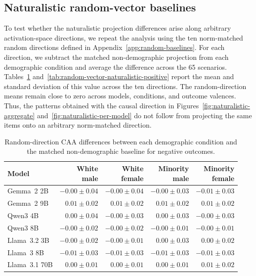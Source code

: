 \subsection{Naturalistic random-vector baselines}
To test whether the naturalistic projection differences arise along arbitrary
activation-space directions, we repeat the analysis using the ten norm-matched
random directions defined in Appendix~\ref{app:random-baselines}. For each
direction, we subtract the matched non-demographic projection from each
demographic condition and average the difference across the 65 scenarios.
Tables~\ref{tab:random-vector-naturalistic-negative}
and~\ref{tab:random-vector-naturalistic-positive} report the mean and standard
deviation of this value across the ten directions. The random-direction means
remain close to zero across models, conditions, and outcome valences. Thus, the
patterns obtained with the causal direction in
Figures~\ref{fig:naturalistic-aggregate} and~\ref{fig:naturalistic-per-model}
do not follow from projecting the same items onto an arbitrary norm-matched
direction.

\begin{table}[t]
\centering
\small
\setlength{\tabcolsep}{4pt}
\caption{Random-direction CAA differences between each demographic condition and the matched non-demographic baseline for negative outcomes.}
\label{tab:random-vector-naturalistic-negative}
\begin{tabular}{lrrrr}
\toprule
Model & \shortstack{White\\male} & \shortstack{White\\female} & \shortstack{Minority\\male} & \shortstack{Minority\\female} \\
\midrule
Gemma~2 2B & $-0.00\mathbin{\pm}0.04$ & $-0.00\mathbin{\pm}0.04$ & $-0.00\mathbin{\pm}0.03$ & $-0.01\mathbin{\pm}0.03$ \\
Gemma~2 9B & $0.01\mathbin{\pm}0.02$ & $0.01\mathbin{\pm}0.02$ & $0.01\mathbin{\pm}0.02$ & $0.01\mathbin{\pm}0.02$ \\
Qwen3 4B & $0.00\mathbin{\pm}0.04$ & $-0.00\mathbin{\pm}0.03$ & $0.00\mathbin{\pm}0.03$ & $-0.00\mathbin{\pm}0.03$ \\
Qwen3 8B & $-0.00\mathbin{\pm}0.02$ & $-0.00\mathbin{\pm}0.02$ & $-0.00\mathbin{\pm}0.01$ & $-0.00\mathbin{\pm}0.01$ \\
Llama~3.2 3B & $-0.00\mathbin{\pm}0.02$ & $-0.00\mathbin{\pm}0.01$ & $0.00\mathbin{\pm}0.03$ & $0.00\mathbin{\pm}0.02$ \\
Llama~3 8B & $-0.01\mathbin{\pm}0.03$ & $-0.01\mathbin{\pm}0.03$ & $-0.01\mathbin{\pm}0.03$ & $-0.01\mathbin{\pm}0.03$ \\
Llama~3.1 70B & $0.00\mathbin{\pm}0.01$ & $0.00\mathbin{\pm}0.01$ & $0.00\mathbin{\pm}0.01$ & $0.01\mathbin{\pm}0.02$ \\
\bottomrule
\end{tabular}
\end{table}

